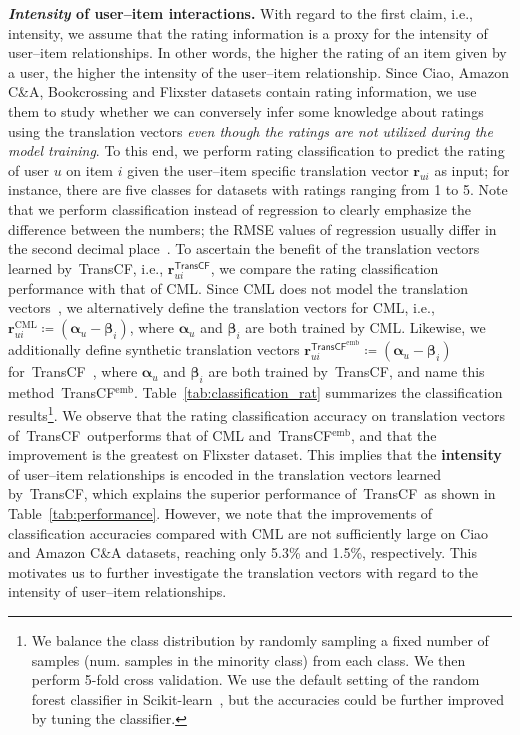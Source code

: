 \documentclass[conference]{IEEEtran}
\newcommand{\propose}{\textsf{{TransCF}}}
\newcommand{\proposeemb}{\propose$^{\mathrm{emb}}$}
\begin{document}
\smallskip
\noindent\textbf{\textit{Intensity} of user--item interactions.}
With regard to the first claim, i.e., intensity, we assume that the rating information is a proxy for the intensity of user--item relationships. In other words, the higher the rating of an item given by a user, the higher the intensity of the user--item relationship. Since Ciao, Amazon C\&A, Bookcrossing and Flixster datasets contain rating information, we use them to study whether we can conversely infer some knowledge about ratings using the translation vectors \textit{even though the ratings are not utilized during the model training}. 
To this end, we perform rating classification to predict the rating of user $u$ on item $i$ given the user--item specific translation vector $\bm{r}_{ui}$ as input; for instance, there are five classes for datasets with ratings ranging from 1 to 5. Note that we perform classification instead of regression to clearly emphasize the difference between the numbers; the RMSE values of regression usually differ in the second decimal place~\cite{koren2008factorization}.
To ascertain the benefit of the translation vectors learned by~\propose, i.e., $\bm{r}^{\propose}_{ui}$, we compare the rating classification performance with that of CML. Since CML does not model the translation vectors~\cite{hsieh2017collaborative}, we alternatively define the translation vectors for CML, i.e., $\bm{r}^{\mathrm{CML}}_{ui}\coloneqq (\bm{\alpha}_u-\bm{\beta}_i)$, where $\bm{\alpha}_u$ and $\bm{\beta}_i$ are both trained by CML. Likewise, we additionally define synthetic translation vectors $\bm{r}_{ui}^{\propose^{\mathrm{emb}}}\coloneqq (\bm{\alpha}_u-\bm{\beta}_i)$ for~\propose~, where $\bm{\alpha}_u$ and $\bm{\beta}_i$ are both trained by~\propose, and name this method~\proposeemb. Table~\ref{tab:classification_rat} summarizes the classification results\footnote{\label{note1}We balance the class distribution by randomly sampling a fixed number of samples (num. samples in the minority class) from each class. We then perform 5-fold cross validation. We use the default setting of the random forest classifier in Scikit-learn~\cite{scikit-learn}, but the accuracies could be further improved by tuning the classifier.}.
We observe that the rating classification accuracy on translation vectors of~\propose~outperforms that of CML and~\proposeemb, and that the improvement is the greatest on Flixster dataset. 
This implies that the \textbf{intensity} of user--item relationships is encoded in the translation vectors learned by~\propose, which explains the superior performance of~\propose~as shown in Table~\ref{tab:performance}.
However, we note that the improvements of classification accuracies compared with CML are not sufficiently large on Ciao and Amazon C\&A datasets, reaching only 5.3\% and 1.5\%, respectively.
This motivates us to further investigate the translation vectors with regard to the intensity of user--item relationships.
\end{document}
